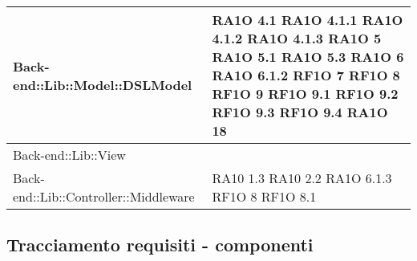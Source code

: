 \begin{center}
\begin{longtable}{|p{7cm}|p{3cm}|}
			Back-end::Lib::Model::DSLModel & RA1O 4.1 \newline RA1O 4.1.1 \newline RA1O 4.1.2 \newline  RA1O 4.1.3 \newline
			RA1O 5 \newline RA1O 5.1 \newline RA1O 5.3 \newline RA1O 6 \newline RA1O 6.1.2 \newline RF1O 7 \newline RF1O 8 \newline		
			RF1O 9 \newline	RF1O 9.1 \newline RF1O 9.2 \newline RF1O 9.3 \newline	RF1O 9.4 \newline RA1O 18 \newline	
			\\ \hline
			
			
			Back-end::Lib::View & 		\\ \hline
			
			Back-end::Lib::Controller::Middleware & RA10 1.3 \newline RA10 2.2 \newline RA1O 6.1.3 \newline RF1O 8 \newline RF1O 8.1 \newline		\\ \hline

   \end{longtable}
      \egroup
      \end{center}  
\clearpage

\subsection{Tracciamento requisiti - componenti}

